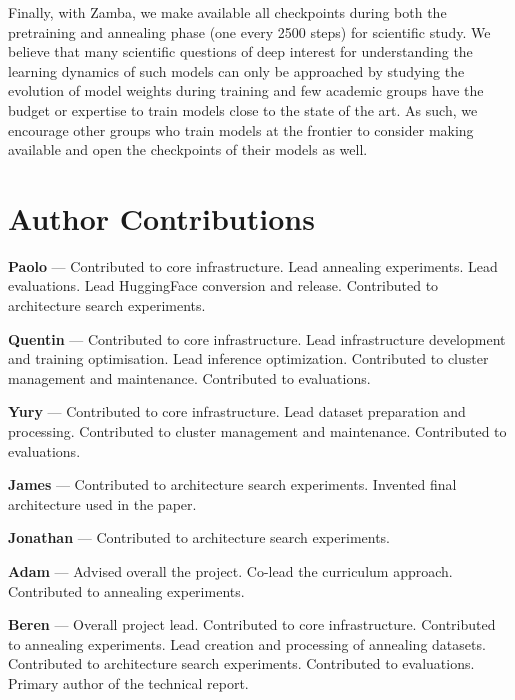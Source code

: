 Finally, with Zamba, we make available all checkpoints during both the pretraining and annealing phase (one every 2500 steps) for scientific study. We believe that many scientific questions of deep interest for understanding the learning dynamics of such models can only be approached by studying the evolution of model weights during training and few academic groups have the budget or expertise to train models close to the state of the art. As such, we encourage other groups who train models at the frontier to consider making available and open the checkpoints of their models as well.

\section*{Author Contributions}
\textbf{Paolo} — Contributed to core infrastructure. Lead annealing experiments. Lead evaluations. Lead HuggingFace conversion and release. Contributed to architecture search experiments.

\textbf{Quentin} — Contributed to core infrastructure. Lead infrastructure development and training optimisation. Lead inference optimization. Contributed to cluster management and maintenance. Contributed to evaluations.

\textbf{Yury} — Contributed to core infrastructure. Lead dataset preparation and processing. Contributed to cluster management and maintenance. Contributed to evaluations.

\textbf{James} — Contributed to architecture search experiments. Invented final architecture used in the paper.

\textbf{Jonathan} — Contributed to architecture search experiments. 

\textbf{Adam} — Advised overall the project. Co-lead the curriculum approach. Contributed to annealing experiments. 

\textbf{Beren} — Overall project lead. Contributed to core infrastructure. Contributed to annealing experiments. Lead creation and processing of annealing datasets. Contributed to architecture search experiments. Contributed to evaluations. Primary author of the technical report.


